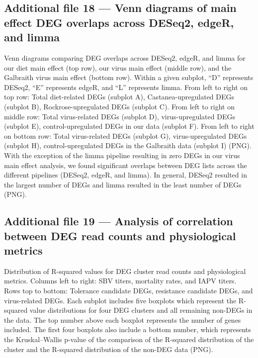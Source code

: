 \documentclass{bmcart}
\begin{document}
\begin{linenumbers}
\begin{backmatter}
   \subsection*{Additional file 18 --- Venn diagrams of main effect DEG overlaps across DESeq2, edgeR, and limma}
  Venn diagrams comparing DEG overlaps across DESeq2, edgeR, and limma for our diet main effect (top row), our virus main effect (middle row), and the Galbraith virus main effect (bottom row). Within a given subplot, ``D'' represents DESeq2, ``E'' represents edgeR, and ``L'' represents limma. From left to right on top row: Total diet-related DEGs (subplot A), Castanea-upregulated DEGs (subplot B), Rockrose-upregulated DEGs (subplot C). From left to right on middle row: Total virus-related DEGs (subplot D), virus-upregulated DEGs (subplot E), control-upregulated DEGs in our data (subplot F). From left to right on bottom row: Total virus-related DEGs (subplot G), virus-upregulated DEGs (subplot H), control-upregulated DEGs in the Galbraith data (subplot I) (PNG). With the exception of the limma pipeline resulting in zero DEGs in our virus main effect analysis, we found significant overlaps between DEG lists across the different pipelines (DESeq2, edgeR, and limma). In general, DESeq2 resulted in the largest number of DEGs and limma resulted in the least number of DEGs (PNG). 
  
  \subsection*{Additional file 19 --- Analysis of correlation between DEG read counts and physiological metrics}
  Distribution of R-squared values for DEG cluster read counts and physiological metrics. Columns left to right: SBV titers, mortality rates, and IAPV titers. Rows top to bottom: Tolerance candidate DEGs, resistance candidate DEGs, and virus-related DEGs. Each subplot includes five boxplots which represent the R-squared value distributions for four DEG clusters and all remaining non-DEGs in the data. The top number above each boxplot represents the number of genes included. The first four boxplots also include a bottom number, which represents the Kruskal–Wallis p-value of the comparison of the R-squared distribution of the cluster and the R-squared distribution of the non-DEG data (PNG).
  
\end{backmatter}
\end{linenumbers} %
\end{document}

